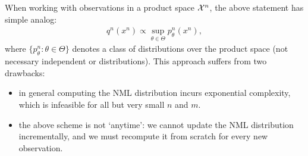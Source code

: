         \begin{remark}
            \label{remark:nml-product-space} When working with observations in a product space $\mathcal{X}^n$, the above statement has simple analog: 
            \begin{align}
                q^n(x^n) \propto \sup_{\theta \in \Theta} p^n_{\theta}(x^n), 
            \end{align}
            where $\{p^n_\theta: \theta \in \Theta \}$ denotes a class of distributions over the product space (not necessary independent or \iid distributions). This approach suffers from two drawbacks: 
            \begin{itemize}
                \item in general computing the NML distribution incurs exponential complexity, which is infeasible for all but very small $n$ and $m$. 
                \item the above scheme is not `anytime': we cannot update the NML distribution incrementally, and we must recompute it from scratch for every new observation. 
            \end{itemize}
        \end{remark}

